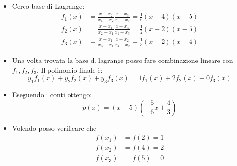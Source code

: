 \documentclass[12pt,a4paper,oneside]{article}
\begin{document}
\begin{itemize}
	\item Cerco base di Lagrange:
	      \begin{align*}
		      f_1 \left( x \right) & = \frac{x-x_2}{x_1-x_2} \frac{x-x_3}{x_1-x_3} =\frac{1}{6}\left( x-4 \right) \left( x-5 \right)  \\
		      f_2 \left( x \right) & = \frac{x-x_1}{x_2-x_1} \frac{x-x_3}{x_2-x_3} = \frac{1}{2}\left( x-2 \right) \left( x-5 \right) \\
		      f_3\left( x \right)  & = \frac{x-x_1}{x_3-x_1} \frac{x-x_2}{x_3-x_2}=\frac{1}{3}\left( x-2 \right) \left( x-4 \right)
	      \end{align*}
	\item Una volta trovata la base di lagrange posso fare combinazione lineare con $f_1, f_2, f_3$. Il polinomio finale è:
	      \[
		      y_1f_1\left( x \right)  + y_2f_2\left( x \right) + y_3f_3\left( x \right) = 1f_1\left( x \right) + 2f_2\left( x \right) + 0 f_3\left( x \right)
	      \]
	\item Eseguendo i conti ottengo:
	      \[
		      p\left( x \right) = \left( x-5 \right) \left( -\frac{5}{6}x + \frac{4}{3} \right)
	      \]
	\item Volendo posso verificare che
	      \begin{align*}
		      f\left( x_1 \right) & =  f\left( 2 \right) =1 \\
		      f\left( x_2 \right) & =  f\left( 4 \right) =2 \\
		      f\left( x_3 \right) & = f\left( 5 \right) =0
	      \end{align*}
\end{itemize}
\end{document}
